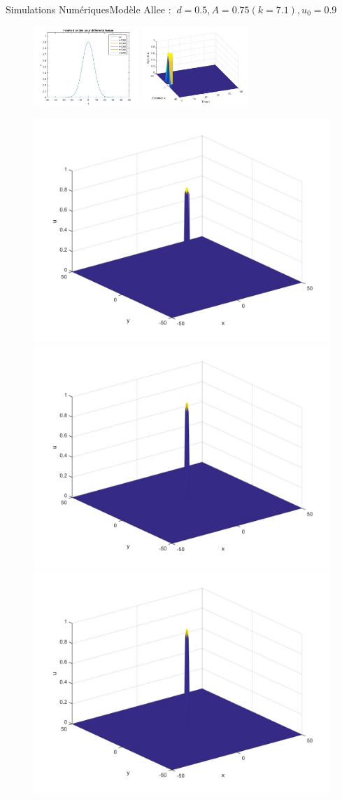 \documentclass[10pt]{beamer}
\begin{document}
\begin{frame}{Simulations Numériques}{Modèle Allee : $\ d=0.5, A=0.75 (k=7.1), u_0=0.9$}
\begin{figure}[H]
	\centering
	\includegraphics[width=0.40\linewidth, height=3cm]{Allee/F2323}\hfill
	\includegraphics[width=0.55\linewidth, height=3cm]{Allee/F4323}
\end{figure}
\begin{figure}[H]
	\centering
	\includegraphics[width=0.3\linewidth]{Allee/323__1_}\hfill
    \includegraphics[width=0.3\linewidth]{Allee/323__2_}\hfill
	\includegraphics[width=0.3\linewidth]{Allee/323__3_}
\end{figure}
\end{frame}
\end{document}
